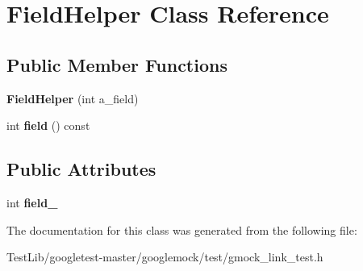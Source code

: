 \hypertarget{classFieldHelper}{}\section{Field\+Helper Class Reference}
\label{classFieldHelper}
\subsection*{Public Member Functions}
\begin{DoxyCompactItemize}
\item 
\mbox{\label{classFieldHelper_a06729cbd5da2993e8007cb62f1d00b3a}} 
{\bfseries Field\+Helper} (int a\+\_\+field)
\item 
\mbox{\label{classFieldHelper_af2959e142813205aeeb4d2ad27430ad3}} 
int {\bfseries field} () const
\end{DoxyCompactItemize}
\subsection*{Public Attributes}
\begin{DoxyCompactItemize}
\item 
\mbox{\label{classFieldHelper_a50a7ec9efc60377363d5ce8bea1708ac}} 
int {\bfseries field\+\_\+}
\end{DoxyCompactItemize}


The documentation for this class was generated from the following file\+:\begin{DoxyCompactItemize}
\item 
Test\+Lib/googletest-\/master/googlemock/test/gmock\+\_\+link\+\_\+test.\+h\end{DoxyCompactItemize}
